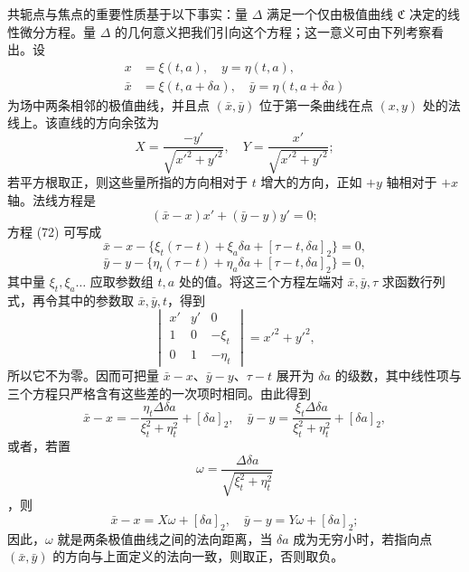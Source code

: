 \documentclass[11pt,a4paper,leqno]{article}
\begin{document}
共轭点与焦点的重要性质基于以下事实：量 $\Delta$ 满足一个仅由极值曲线 $\mathfrak{C}$ 决定的线性微分方程。量 $\Delta$ 的几何意义把我们引向这个方程；这一意义可由下列考察看出。设
\begin{equation}\tag{72}
\begin{aligned}
x&=\xi(t,a),\quad y=\eta(t,a),\\
\bar x&=\xi(t,a+\delta a),\quad \bar y=\eta(t,a+\delta a)
\end{aligned}
\end{equation}
为场中两条相邻的极值曲线，并且点 $(\bar x,\bar y)$ 位于第一条曲线在点 $(x,y)$ 处的法线上。该直线的方向余弦为
\[
X=\frac{-y'}{\sqrt{x'^2+y'^2}},\quad Y=\frac{x'}{\sqrt{x'^2+y'^2}};
\]
若平方根取正，则这些量所指的方向相对于 $t$ 增大的方向，正如 $+y$ 轴相对于 $+x$ 轴。法线方程是
\[
(\bar x-x)x'+(\bar y-y)y'=0;
\]
方程 (72) 可写成
\[
\bar x-x-\{\xi_t(\tau-t)+\xi_a\delta a+[\tau-t,\delta a]_2\}=0,
\]
\[
\bar y-y-\{\eta_t(\tau-t)+\eta_a\delta a+[\tau-t,\delta a]_2\}=0,
\]
其中量 $\xi_t,\xi_a\ldots$ 应取参数组 $t,a$ 处的值。将这三个方程左端对 $\bar x,\bar y,\tau$ 求函数行列式，再令其中的参数取 $\bar x,\bar y,t$，得到
\[
\begin{vmatrix}
x'&y'&0\\
1&0&-\xi_t\\
0&1&-\eta_t
\end{vmatrix}=x'^2+y'^2,
\]
所以它不为零。因而可把量 $\bar x-x$、$\bar y-y$、$\tau-t$ 展开为 $\delta a$ 的级数，其中线性项与三个方程只严格含有这些差的一次项时相同。由此得到
\[
\bar x-x=-\frac{\eta_t\Delta\delta a}{\xi_t^2+\eta_t^2}+[\delta a]_2,\quad
\bar y-y=\frac{\xi_t\Delta\delta a}{\xi_t^2+\eta_t^2}+[\delta a]_2,
\]
或者，若置
\begin{equation}\tag{73}
\omega=\frac{\Delta\delta a}{\sqrt{\xi_t^2+\eta_t^2}}
\end{equation}
，则
\[
\bar x-x=X\omega+[\delta a]_2,
\quad
\bar y-y=Y\omega+[\delta a]_2;
\]
因此，$\omega$ 就是两条极值曲线之间的法向距离，当 $\delta a$ 成为无穷小时，若指向点 $(\bar x,\bar y)$ 的方向与上面定义的法向一致，则取正，否则取负。
\end{document}
